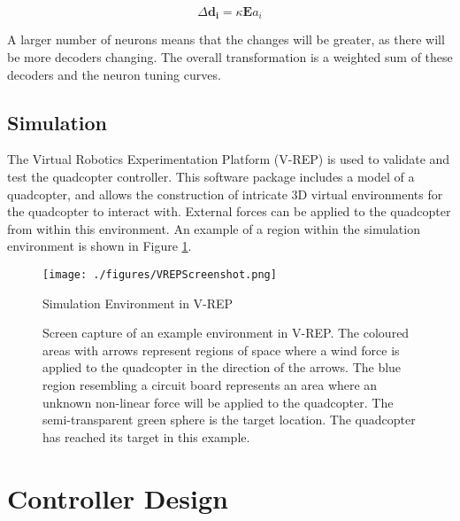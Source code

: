 \documentclass[letterpaper, 10 pt, conference]{ieeeconf}  %
\begin{document}
\begin{equation} \label{eq:PES}
\Delta \bm{d_{i}} = \kappa \bm{E} a_{i}
\end{equation}

A larger number of neurons means that the changes will be greater, as there will be more decoders changing. The overall transformation is a weighted sum of these decoders and the neuron tuning curves. 

\subsection{Simulation}

The Virtual Robotics Experimentation Platform (V-REP) \cite{vrep} is used to validate and test the quadcopter controller.
This software package includes a model of a quadcopter, and allows the construction of intricate 3D virtual environments for the quadcopter to interact with.
External forces can be applied to the quadcopter from within this environment.
An example of a region within the simulation environment is shown in Figure \ref{fig:vrep_screenshot}.

\begin{figure}
\centering
\texttt{[image: ./figures/VREPScreenshot.png]}
\caption{Simulation Environment in V-REP}
\label{fig:vrep_screenshot}
\captionsetup{singlelinecheck=off,font=footnotesize}
\caption*{
Screen capture of an example environment in V-REP. The coloured areas with arrows represent regions of space where a wind force is applied to the quadcopter in the direction of the arrows. The blue region resembling a circuit board represents an area where an unknown non-linear force will be applied to the quadcopter. The semi-transparent green sphere is the target location. The quadcopter has reached its target in this example.}
\end{figure}

\section{Controller Design}
\end{document}
